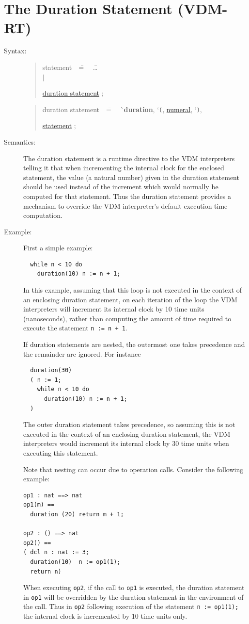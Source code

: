 \documentclass{overturerepchap}
\newcommand{\Lit}[1]{`{\tt #1}\Quote}
\newcommand{\Rule}[2]{
  \begin{quote}\begin{tabbing}
    #1\index{#1}\ \ \= = \ \ \= #2  ; %
    
  \end{tabbing}\end{quote}
  }
\newcommand{\Ruleref}[1]{
  \hyperlink{rule:#1}{#1}}
\newcommand{\dsep}{\\ \> $|$ \>}
\newcommand{\Lop}[1]{`{\bf\ttfamily #1}\Quote}
\begin{document}
\section{The Duration Statement (VDM-RT)}
\begin{description}
\item[Syntax:]
  \Rule{statement}{
    \ldots \dsep
    \Ruleref{duration statement}
  }
  \Rule{duration statement}{
    \Lop{duration}, \Lit{(}, \Ruleref{numeral}, \Lit{)},
    \Ruleref{statement}
  }

\item[Semantics:]
The duration statement is a runtime directive to the VDM
interpreters telling it that when incrementing the internal clock for the
enclosed statement, the value (a natural number)
given in the duration statement should
be used instead of the increment which would normally be computed for that
statement. Thus the duration statement provides a mechanism to
override the VDM interpreter's default execution time computation.

\item[Example:] First a simple example:
\begin{lstlisting}
  while n < 10 do
    duration(10) n := n + 1; 
\end{lstlisting}
In this example, assuming that this loop is not executed in the
context of an enclosing duration statement, on each iteration of the
loop the VDM interpreters will increment its internal clock by 10 time
units (nanoseconds),
rather than computing the amount of time required to execute the
statement \texttt{n := n + 1}. 

If duration statements are nested, the outermost one takes precedence
and the remainder are ignored. For instance
\begin{lstlisting}
  duration(30)
  ( n := 1;
    while n < 10 do
      duration(10) n := n + 1; 
  )
\end{lstlisting}
The outer duration statement takes precedence, so assuming this is not
executed in the context of an enclosing duration statement, the
VDM interpreters would increment its internal clock by 30 time units when
executing this statement.

Note that nesting can occur due to operation calls. Consider the
following example:
\begin{lstlisting}
op1 : nat ==> nat
op1(m) ==
  duration (20) return m + 1;

op2 : () ==> nat
op2() ==
( dcl n : nat := 3;
  duration(10)  n := op1(1);
  return n) 
\end{lstlisting}
When executing \texttt{op2}, if the call to \texttt{op1} is
executed, the duration statement in \texttt{op1} will be overridden by
the duration statement in the environment of the call. Thus in
\texttt{op2} following execution of the statement 
\texttt{n := op1(1);} the internal clock is incremented by 10 time units
only. 


\end{description}
\end{document}
